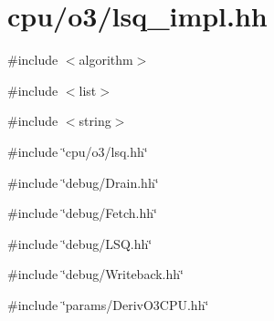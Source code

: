 \hypertarget{lsq__impl_8hh}{
\section{cpu/o3/lsq\_\-impl.hh}
\label{lsq__impl_8hh}
}
{\ttfamily \#include $<$algorithm$>$}\par
{\ttfamily \#include $<$list$>$}\par
{\ttfamily \#include $<$string$>$}\par
{\ttfamily \#include \char`\"{}cpu/o3/lsq.hh\char`\"{}}\par
{\ttfamily \#include \char`\"{}debug/Drain.hh\char`\"{}}\par
{\ttfamily \#include \char`\"{}debug/Fetch.hh\char`\"{}}\par
{\ttfamily \#include \char`\"{}debug/LSQ.hh\char`\"{}}\par
{\ttfamily \#include \char`\"{}debug/Writeback.hh\char`\"{}}\par
{\ttfamily \#include \char`\"{}params/DerivO3CPU.hh\char`\"{}}\par
